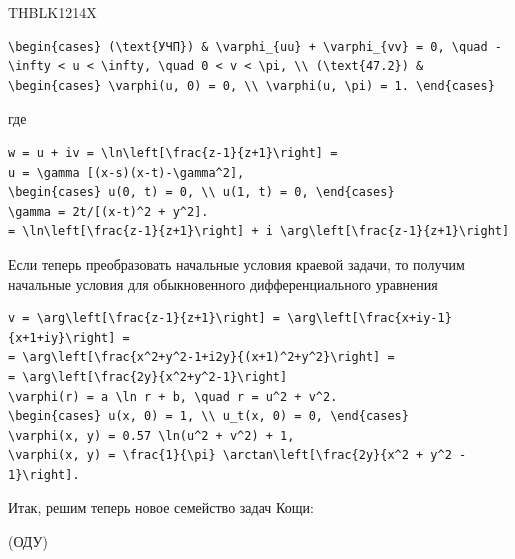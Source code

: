 \documentclass[
  ukrainian,
]{article}
\begin{document}
THBLK1214X

\begin{verbatim}
\begin{cases} (\text{УЧП}) & \varphi_{uu} + \varphi_{vv} = 0, \quad -\infty < u < \infty, \quad 0 < v < \pi, \\ (\text{47.2}) & \begin{cases} \varphi(u, 0) = 0, \\ \varphi(u, \pi) = 1. \end{cases}
\end{verbatim}

где

\begin{verbatim}
w = u + iv = \ln\left[\frac{z-1}{z+1}\right] =
u = \gamma [(x-s)(x-t)-\gamma^2],
\begin{cases} u(0, t) = 0, \\ u(1, t) = 0, \end{cases}
\gamma = 2t/[(x-t)^2 + y^2].
= \ln\left[\frac{z-1}{z+1}\right] + i \arg\left[\frac{z-1}{z+1}\right]
\end{verbatim}

Если теперь преобразовать начальные условия краевой задачи, то получим
начальные условия для обыкновенного дифференциального уравнения

\begin{verbatim}
v = \arg\left[\frac{z-1}{z+1}\right] = \arg\left[\frac{x+iy-1}{x+1+iy}\right] =
= \arg\left[\frac{x^2+y^2-1+i2y}{(x+1)^2+y^2}\right] =
= \arg\left[\frac{2y}{x^2+y^2-1}\right]
\varphi(r) = a \ln r + b, \quad r = u^2 + v^2.
\begin{cases} u(x, 0) = 1, \\ u_t(x, 0) = 0, \end{cases}
\varphi(x, y) = 0.57 \ln(u^2 + v^2) + 1,
\varphi(x, y) = \frac{1}{\pi} \arctan\left[\frac{2y}{x^2 + y^2 - 1}\right].
\end{verbatim}

Итак, решим теперь новое семейство задач Кощи:

(ОДУ)
\end{document}
